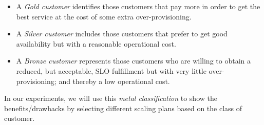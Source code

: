 \begin{itemize}
\item A \emph{Gold customer} identifies those customers that pay more in order to get the best service at the cost of some extra over-provisioning. 
\item A \emph{Silver customer} includes those customers that prefer to get good availability but with a reasonable operational cost.
\item A  \emph{Bronze customer} represents those customers who are willing to obtain a reduced, but acceptable, SLO fulfillment but with very little over-provisioning; and thereby a low operational cost. 

\end{itemize}

In our experiments, we will use this \emph{metal classification} to show the benefits/drawbacks by selecting different scaling plans based on the class of customer.






